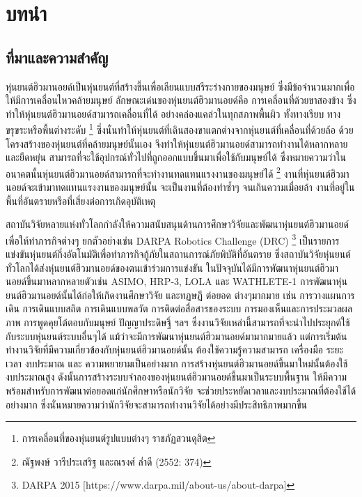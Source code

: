 \chapter{บทนำ}
\section{ที่มาและความสำคัญ}
หุ่นยนต์ฮิวมานอยด์เป็นหุ่นยนต์ที่สร้างขึ้นเพื่อเลียนแบบสรีระร่างกายของมนุษย์ 
ซึ่งมีข้อจำนวนมากเพื่อให้มีการเคลื่อนไหวคล้ายมนุษย์ ลักษณะเด่นของหุ่นยนต์ฮิวมานอยด์คือ
การเคลื่อนที่ด้วยขาสองข้าง ซึ่งทำให้หุ่นยนต์ฮิวมานอยด์สามารถเคลื่อนที่ได้
อย่างคล่องแคล่วในทุกสภาพพื้นผิว ทั้งทางเรียบ ทางขรุขระหรือพื้นต่างระดับ
\footnote{การเคลื่อนที่ของหุ่นยนต์รูปแบบต่างๆ ราชภัฏสวนดุสิต}
ซึ่งนั่นทำให้หุ่นยนต์ที่เดินสองขาแตกต่างจากหุ่นยนต์ที่เคลื่อนที่ด้วยล้อ ด้วยโครงสร้างของหุ่นยนต์ที่คล้ายมนุษย์นั้นเอง 
จึงทำให้หุ่นยนต์ฮิวมานอยด์สามารถทำงานได้หลากหลายและยืดหยุ่น สามารถที่จะใช้อุปกรณ์ทั่วไปที่ถูกออกแบบขึ้นมาเพื่อใช้กับมนุษย์ได้
ซึ่งหมายความว่าในอนาคตนั้นหุ่นยนต์ฮิวมานอยด์สามารถที่จะทำงานทดแทนแรงงานของมนุษย์ได้
\footnote{ณัฐพงษ์ วารีประเสริฐ และณรงศ์ ล่ำดี (2552: 374)}
งานที่หุ่นยนต์ฮิวมานอยด์จะเข้ามาทดแทนแรงงานของมนุษย์นั้น จะเป็นงานที่ต้องทำซ้ำๆ จนเกินความเมื่อยล้า
งานที่อยู่ในพื้นที่อันตรายหรือที่เสี่ยงต่อการเกิดอุบัติเหตุ

สถาบันวิจัยหลายแห่งทั่วโลกกำลังให้ความสนับสนุนด้านการศึกษาวิจัยและพัฒนาหุ่นยนต์ฮิวมานอยด์
เพื่อให้ทำภารกิจต่างๆ ยกตัวอย่างเช่น DARPA Robotics Challenge (DRC)
\footnote{DARPA 2015 [https://www.darpa.mil/about-us/about-darpa]}
เป็นรายการแข่งขันหุ่นยนต์กึ่งอัตโนมัติเพื่อทำภารกิจกู้ภัยในสถานการณ์ภัยพิบัติที่อันตราย
ซึ่งสถาบันวิจัยหุ่นยนต์ทั่วโลกได้ส่งหุ่นยนต์ฮิวมานอยด์ของตนเข้าร่วมการแข่งขัน ในปัจจุบันได้มีการพัฒนาหุ่นยนต์ฮิวมานอยด์ขึ้นมาหลากหลายตัวเช่น
ASIMO, HRP-3, LOLA และ WATHLETE-1 การพัฒนาหุ่นยนต์ฮิวมานอยด์นั้นได้ก่อให้เกิดงานศึกษาวิจัย
และทฏษฏี ต่อยอด ต่างๆมากมาย เช่น
การวางแผนการเดิน การเดินแบบสถิต การเดินแบบพลวัต การติดต่อสื่อสารของระบบ การมองเห็นและการประมวลผลภาพ
การพูดคุยโต้ตอบกับมนุษย์ ปัญญาประดิษฐิ์ ฯลฯ ซึ่งงานวิจัยเหล่านี้สามารถที่จะนำไปประยุกต์ใช้กับระบบหุ่นยนต์ระบบอื่นๆได้ 
แม้ว่าจะมีการพัฒนาหุ่นยนต์ฮิวมานอยด์มามากมายแล้ว แต่การเริ่มต้นทำงานวิจัยที่มีความเกี่ยวข้องกับหุ่นยนต์ฮิวมานอยด์นั้น
ต้องใช้ความรู้ความสามารถ เครื่องมือ ระยะเวลา งบประมาณ และ
ความพยายามเป็นอย่างมาก การสร้างหุ่นยนต์ฮิวมานอยด์ขึ้นมาใหม่นั้นต้องใช้งบประมาณสูง ดังนั้นการสร้างระบบจำลองของหุ่นยนต์ฮิวมานอยด์ขึ้นมาเป็นระบบพื้นฐาน 
ให้มีความพร้อมสำหรับการพัฒนาต่อยอดแก่นักศึกษาหรือนักวิจัย จะช่วยประหยัดเวลาและงบประมาณที่ต้องใช้ได้อย่างมาก
ซึ่งนั่นหมายความว่านักวิจัยจะสามารถทำงานวิจัยได้อย่างมีประสิทธิภาพมากขึ้น

